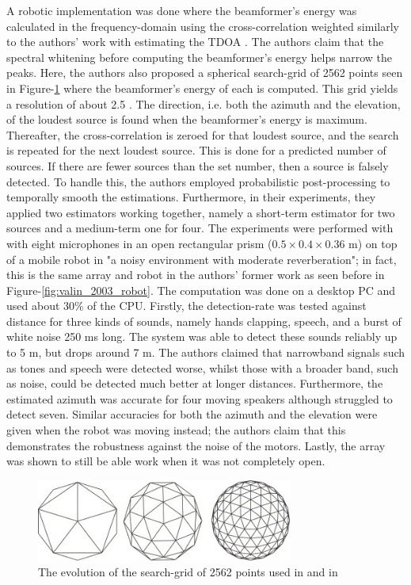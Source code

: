 \documentclass{report}
\begin{document}
A robotic implementation \cite{valin_localization_2004} was done where the beamformer's energy was calculated in the frequency-domain using the cross-correlation weighted similarly to the authors' work with estimating the TDOA \cite{valin_robust_2003}. The authors claim that the spectral whitening before computing the beamformer's energy helps narrow the peaks. Here, the authors also proposed a spherical search-grid of 2562 points seen in Figure-\ref{fig:valin_2007_grid} where the beamformer's energy of each is computed. This grid yields a resolution of about 2.5 \si{\deg}. The direction, i.e. both the azimuth and the elevation, of the loudest source is found when the beamformer's energy is maximum. Thereafter, the cross-correlation is zeroed for that loudest source, and the search is repeated for the next loudest source. This is done for a predicted number of sources. If there are fewer sources than the set number, then a source is falsely detected. To handle this, the authors employed probabilistic post-processing to temporally smooth the estimations. Furthermore, in their experiments, they applied two estimators working together, namely a short-term estimator for two sources and a medium-term one for four. The experiments were performed with with eight microphones in an open rectangular prism ($0.5\times 0.4\times 0.36$ \si{m}) on top of a mobile robot in "a noisy environment with moderate reverberation"; in fact, this is the same array and robot in the authors' former work \cite{valin_robust_2003} as seen before in Figure-\ref{fig:valin_2003_robot}. The computation was done on a desktop PC and used about 30\% of the CPU. Firstly, the detection-rate was tested against distance for three kinds of sounds, namely hands clapping, speech, and a burst of white noise 250 \si{ms} long. The system was able to detect these sounds reliably up to 5 \si{m}, but drops around 7 \si{m}. The authors claimed that narrowband signals such as tones and speech were detected worse, whilst those with a broader band, such as noise, could be detected much better at longer distances. Furthermore, the estimated azimuth was accurate for four moving speakers although struggled to detect seven. Similar accuracies for both the azimuth and the elevation were given when the robot was moving instead; the authors claim that this demonstrates the robustness against the noise of the motors. Lastly, the array was shown to still be able work when it was not completely open.

\begin{figure}[H]
\includegraphics[width=0.75\textwidth]{./valin_2007/grid.jpg}
\centering
\caption{The evolution of the search-grid of 2562 points used in \cite{valin_robust_2003} and in \cite{valin_robust_2007}}
\label{fig:valin_2007_grid}
\centering
\end{figure}
\end{document}
